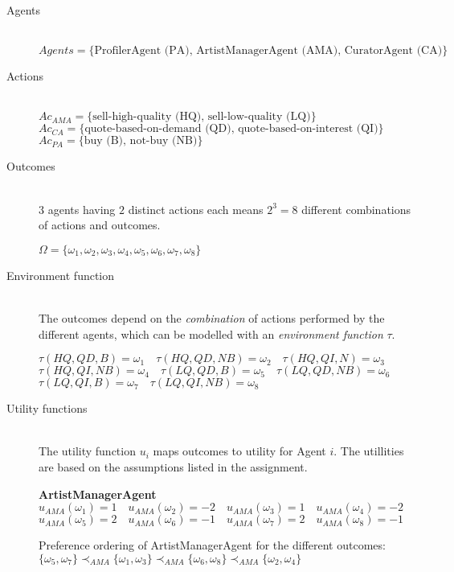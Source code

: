 \documentclass[a4paper, 11pt]{article}
\begin{document}
\begin{description}
\item[Agents] \hfill \\
$Agents = \{\text{ProfilerAgent (PA), ArtistManagerAgent (AMA), CuratorAgent (CA)}\}$

\item[Actions] \hfill \\
$Ac_{AMA} = \{\text{sell-high-quality (HQ), sell-low-quality (LQ)}\}$\\
$Ac_{CA} = \{\text{quote-based-on-demand (QD), quote-based-on-interest (QI)}\}$\\
$Ac_{PA} = \{\text{buy (B), not-buy (NB)}\}$

\item[Outcomes]\hfill\\
$3$ agents having $2$ distinct actions each means $2^3 = 8$ different combinations of actions and outcomes.
 
$\Omega = \{\omega_1, \omega_2, \omega_3, \omega_4, \omega_5, \omega_6, \omega_7, \omega_8\}$

\item[Environment function] \hfill\\
The outcomes depend on the \textit{combination} of actions performed by the different agents, which can be modelled with an \textit{environment function} $\tau$. 

$\tau(HQ, QD, B) = \omega_1 \quad \tau(HQ, QD, NB) = \omega_2 \quad \tau(HQ, QI, N) = \omega_3$\\
$\tau(HQ, QI, NB) = \omega_4 \quad \tau(LQ, QD, B) = \omega_5 \quad \tau(LQ, QD, NB) = \omega_6$\\
$\tau(LQ, QI, B) = \omega_7 \quad \tau(LQ, QI, NB) = \omega_8$

\item[Utility functions] \hfill\\
The utility function $u_i$ maps outcomes to utility for Agent $i$. The utillities are based on the assumptions listed in the assignment.

\textbf{ArtistManagerAgent}\\
$u_{AMA}(\omega_1) = 1 \quad u_{AMA}(\omega_2) = -2 \quad u_{AMA}(\omega_3) = 1 \quad u_{AMA}(\omega_4) = -2$ \\
$u_{AMA}(\omega_5) = 2 \quad u_{AMA}(\omega_6) = -1 \quad u_{AMA}(\omega_7) = 2 \quad u_{AMA}(\omega_8) = -1$

Preference ordering of ArtistManagerAgent for the different outcomes:\\
$\{\omega_5, \omega_7\}\prec_{AMA} \{\omega_1, \omega_3\} \prec_{AMA} \{\omega_6, \omega_8\} \prec_{AMA} \{\omega_2, \omega_4\}$


\end{description}
\end{document}
